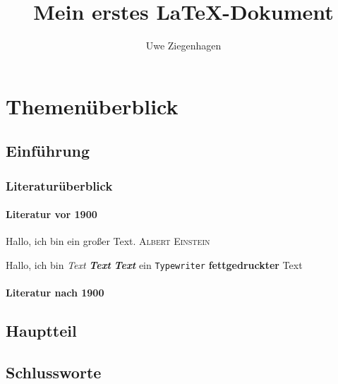\documentclass[12pt,ngerman,parskip=half]{scrreprt}
\author{Uwe Ziegenhagen}
\title{Mein erstes \LaTeX-Dokument}
\newcommand{\person}[1]{\textsc{#1}}
\begin{document}
\maketitle

\tableofcontents

\chapter{Themenüberblick}

\section{Einführung}
\subsection{Literaturüberblick}
\subsubsection{Literatur vor 1900}

Hallo, ich {\tiny bin} ein {\Huge großer} Text. \person{Albert Einstein}

Hallo, ich bin \textit{Text} \textit{\textbf{Text}} \textbf{\textit{Text}}   ein \texttt{Typewriter} \textbf{fettgedruckter} Text

\blindtext

\blindtext

\blindtext

\subsubsection{Literatur nach 1900}

\blindtext

\blindtext

\blindtext

\section{Hauptteil}

\blindtext[100]


\section{Schlussworte}

\blindtext[10]
\end{document}
